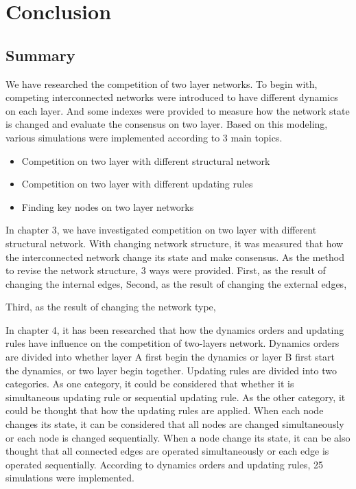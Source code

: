 
\chapter{Conclusion}
\label{chap:conclusion}
\section{Summary}
We have researched the competition of two layer networks. To begin with, competing interconnected networks were introduced to have different dynamics on each layer. And some indexes were provided to measure how the network state is changed and evaluate the consensus on two layer. Based on this modeling, various simulations were implemented according to 3 main topics.
\begin{itemize}
\item Competition on two layer with different structural network
\item Competition on two layer with different updating rules
\item Finding key nodes on two layer networks
\end{itemize}

In chapter 3, we have investigated competition on two layer with different structural network. With changing network structure, it was measured that how the interconnected network change its state and make consensus. As the method to revise the network structure, 3 ways were provided. First, as the result of changing the internal edges, 
Second, as the result of changing the external edges, 

Third, as the result of changing the network type,  

In chapter 4, it has been researched that how the dynamics orders and updating rules have influence on the competition of two-layers network. Dynamics orders are divided into whether layer A first begin the dynamics or layer B first start the dynamics, or two layer begin together. Updating rules are divided into two categories. As one category, it could be considered that whether it is simultaneous updating rule or sequential updating rule. As the other category, it could be thought that how the updating rules are applied. When each node changes its state, it can be considered that all nodes are changed simultaneously or each node is changed sequentially. When a node change its state, it can be also thought that all connected edges are operated simultaneously or each edge is operated sequentially. 
According to dynamics orders and updating rules, 25 simulations were implemented.   

